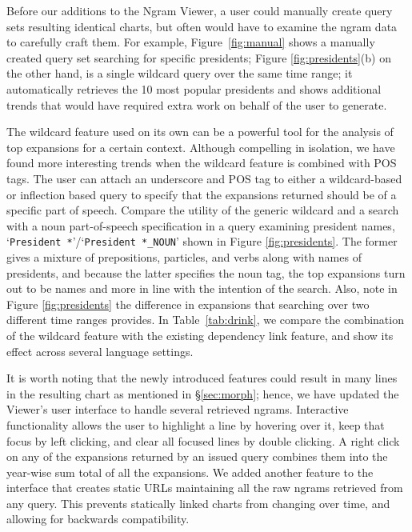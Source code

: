\documentclass[11pt,a4paper]{article}
\newcommand{\query}[1]{\texttt{#1}}
\begin{document}
Before our additions to the Ngram Viewer, a user could manually create query sets resulting identical charts, but often would have to examine the ngram data to carefully craft them. For example, Figure~\ref{fig:manual} shows a manually created query set searching for specific presidents; Figure \ref{fig:presidents}(b) on the other hand, is a single wildcard query over the same time range; it automatically retrieves the 10 most popular presidents and shows additional trends that would have required extra work on behalf of the user to generate.

The wildcard feature used on its own can be a powerful tool for the analysis of top expansions for a certain context.  Although compelling in isolation, we have found more interesting trends when the wildcard feature is combined with POS tags. The user can attach an underscore and POS tag to either a wildcard-based or inflection based query to specify that the expansions returned should be of a specific part of speech. Compare the utility of the generic wildcard and a search with a noun part-of-speech specification in a query examining president names, `\query{President *}'/`\query{President *\_NOUN}' shown in Figure \ref{fig:presidents}. The former gives a mixture of prepositions, particles, and verbs along with names of presidents, and because the latter specifies the noun tag, the top expansions turn out to be names and more in line with the intention of the search. Also, note in Figure \ref{fig:presidents} the difference in expansions that searching over two different time ranges provides. In Table~\ref{tab:drink}, we compare the combination of the wildcard feature with the existing
dependency link feature, and show its effect across several language settings.

It is worth noting that the newly introduced features could result in many lines in the resulting chart as mentioned in \S\ref{sec:morph}; hence, we have updated the Viewer's user interface to handle several retrieved ngrams. Interactive functionality allows the user to highlight a line by hovering over it, keep that focus by left clicking, and clear all focused lines by double clicking. A right click on any of the expansions returned by an issued query combines them into the year-wise sum total of all the expansions. We added another feature to the interface that creates static URLs maintaining all the raw ngrams retrieved from any query. This prevents statically linked charts from changing over time, and allowing for backwards compatibility.
\end{document}
